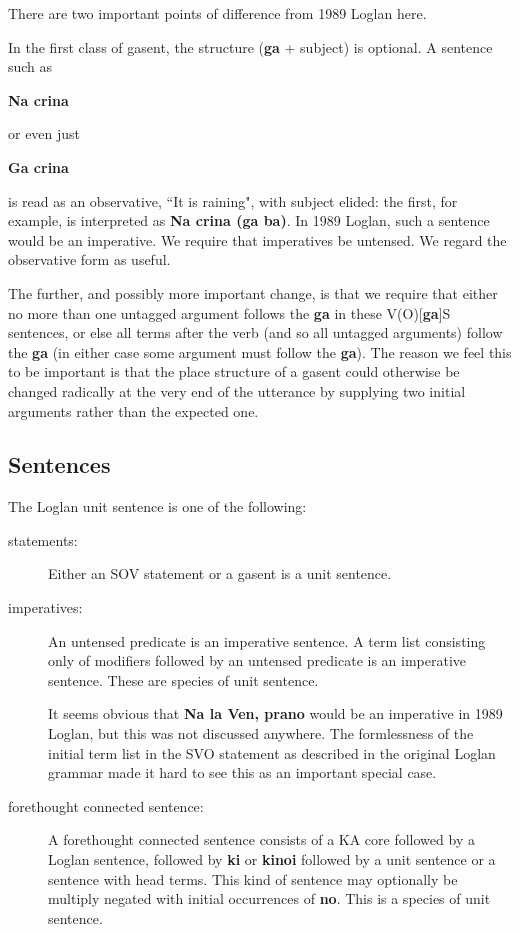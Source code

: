 \documentclass[12pt]{book}
\begin{document}
{There are two important points of difference from 1989 Loglan here.

In the first class of gasent, the structure ({\bf ga} + subject) is optional.  A sentence such as

{\bf Na crina}

or even just

{\bf Ga crina}

is read as an observative, ``It is raining", with subject elided:  the first, for example,  is interpreted as {\bf Na crina (ga ba)}.  In 1989 Loglan, such a sentence would be an imperative.  We require that
imperatives be untensed.  We regard the observative form as useful.

The further, and possibly more important change, is that we require that either no more than one untagged argument  follows the {\bf ga} in
these V(O)[{\bf ga}]S sentences, or else all terms after the verb (and so all untagged arguments) follow the {\bf ga} (in either case some argument must follow the {\bf ga}).  The reason we feel this to be important is that the place structure of a gasent could otherwise be changed radically at the very end of the utterance by supplying two initial arguments rather than the expected one.



\subsection{Sentences}

The Loglan unit sentence is one of the following:

\begin{description}

\item[statements:]  Either an SOV statement or a gasent is a unit sentence.

\item[imperatives:]  An untensed predicate is an imperative sentence.  A term list consisting only of modifiers followed by an untensed predicate is an imperative sentence.  These are species of unit sentence.



It seems obvious that
{\bf Na la Ven, prano}
would be an imperative in 1989 Loglan, but this was not discussed anywhere.  The formlessness of the initial term list in the SVO statement as described in the original Loglan grammar made it hard to see this as an important special case.

\item[forethought connected sentence:]  A forethought connected sentence consists of a KA core followed by a Loglan sentence, followed by {\bf ki} or {\bf kinoi} followed by a unit sentence or a sentence with head terms.  This kind of sentence may optionally be multiply negated with initial occurrences of {\bf no}.  This is a species of unit sentence.


\end{description}}
\end{document}
